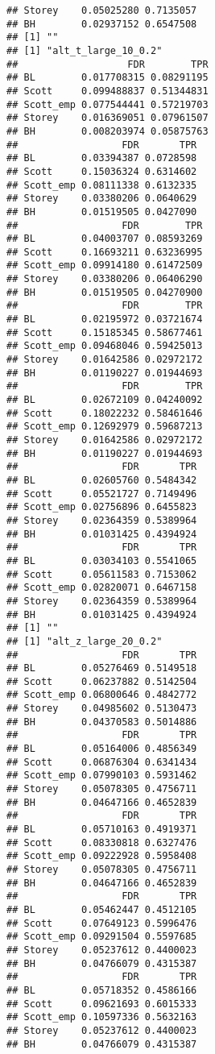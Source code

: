 \documentclass{article}\usepackage[]{graphicx}\usepackage[]{color}
\makeatletter
\newenvironment{kframe}{%
 \def\at@end@of@kframe{}%
 \ifinner\ifhmode%
  \def\at@end@of@kframe{\end{minipage}}%
  \begin{minipage}{\columnwidth}%
 \fi\fi%
 \def\FrameCommand##1{\hskip\@totalleftmargin \hskip-\fboxsep
 \colorbox{shadecolor}{##1}\hskip-\fboxsep
     \hskip-\linewidth \hskip-\@totalleftmargin \hskip\columnwidth}%
 \MakeFramed {\advance\hsize-\width
   \@totalleftmargin\z@ \linewidth\hsize
   \@setminipage}}%
 {\par\unskip\endMakeFramed%
 \at@end@of@kframe}
\newenvironment{knitrout}{}{} %
\makeatother
\begin{document}
\begin{knitrout}
\begin{kframe}
\begin{verbatim}
## Storey    0.05025280 0.7135057
## BH        0.02937152 0.6547508
## [1] ""
## [1] "alt_t_large_10_0.2"
##                   FDR        TPR
## BL        0.017708315 0.08291195
## Scott     0.099488837 0.51344831
## Scott_emp 0.077544441 0.57219703
## Storey    0.016369051 0.07961507
## BH        0.008203974 0.05875763
##                  FDR       TPR
## BL        0.03394387 0.0728598
## Scott     0.15036324 0.6314602
## Scott_emp 0.08111338 0.6132335
## Storey    0.03380206 0.0640629
## BH        0.01519505 0.0427090
##                  FDR        TPR
## BL        0.04003707 0.08593269
## Scott     0.16693211 0.63236995
## Scott_emp 0.09914180 0.61472509
## Storey    0.03380206 0.06406290
## BH        0.01519505 0.04270900
##                  FDR        TPR
## BL        0.02195972 0.03721674
## Scott     0.15185345 0.58677461
## Scott_emp 0.09468046 0.59425013
## Storey    0.01642586 0.02972172
## BH        0.01190227 0.01944693
##                  FDR        TPR
## BL        0.02672109 0.04240092
## Scott     0.18022232 0.58461646
## Scott_emp 0.12692979 0.59687213
## Storey    0.01642586 0.02972172
## BH        0.01190227 0.01944693
##                  FDR       TPR
## BL        0.02605760 0.5484342
## Scott     0.05521727 0.7149496
## Scott_emp 0.02756896 0.6455823
## Storey    0.02364359 0.5389964
## BH        0.01031425 0.4394924
##                  FDR       TPR
## BL        0.03034103 0.5541065
## Scott     0.05611583 0.7153062
## Scott_emp 0.02820071 0.6467158
## Storey    0.02364359 0.5389964
## BH        0.01031425 0.4394924
## [1] ""
## [1] "alt_z_large_20_0.2"
##                  FDR       TPR
## BL        0.05276469 0.5149518
## Scott     0.06237882 0.5142504
## Scott_emp 0.06800646 0.4842772
## Storey    0.04985602 0.5130473
## BH        0.04370583 0.5014886
##                  FDR       TPR
## BL        0.05164006 0.4856349
## Scott     0.06876304 0.6341434
## Scott_emp 0.07990103 0.5931462
## Storey    0.05078305 0.4756711
## BH        0.04647166 0.4652839
##                  FDR       TPR
## BL        0.05710163 0.4919371
## Scott     0.08330818 0.6327476
## Scott_emp 0.09222928 0.5958408
## Storey    0.05078305 0.4756711
## BH        0.04647166 0.4652839
##                  FDR       TPR
## BL        0.05462447 0.4512105
## Scott     0.07649123 0.5996476
## Scott_emp 0.09291504 0.5597685
## Storey    0.05237612 0.4400023
## BH        0.04766079 0.4315387
##                  FDR       TPR
## BL        0.05718352 0.4586166
## Scott     0.09621693 0.6015333
## Scott_emp 0.10597336 0.5632163
## Storey    0.05237612 0.4400023
## BH        0.04766079 0.4315387

\end{verbatim}
\end{kframe}
\end{knitrout}
\end{document}
